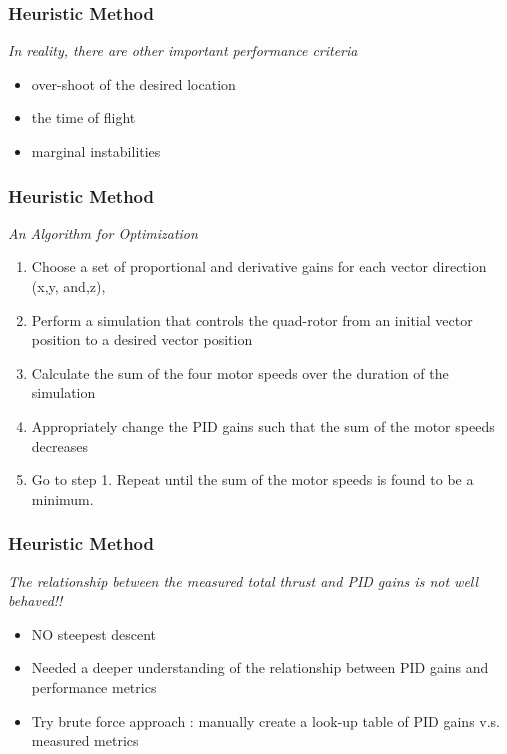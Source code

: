\documentclass{beamer}
\begin{document}
\begin{frame}

\frametitle{Heuristic Method}

\textit{In reality,  there are other important performance criteria}
\begin{itemize}
\item over-shoot of the desired location
\item the time of flight
\item marginal instabilities
\end{itemize}
\end{frame}






\begin{frame}
\frametitle{Heuristic Method}

\textit{An Algorithm for Optimization}
\begin{enumerate}
\item Choose a set of proportional and derivative gains for each vector direction (x,y, and,z),
\item Perform a simulation that controls the quad-rotor from an initial vector position to a desired vector position
\item Calculate the sum of the four motor speeds over the duration of the simulation
\item Appropriately change the PID gains such that the sum of the motor speeds decreases
\item Go to step 1. Repeat until the sum of the motor speeds is found to be a minimum.
\end{enumerate}
\end{frame}



\begin{frame}

\frametitle{Heuristic Method}

\textit{The relationship between the measured total thrust and PID gains is not well behaved!!}

\begin{itemize}
\item NO steepest descent
\item Needed a deeper understanding of the relationship between PID gains and performance metrics
\item Try brute force approach : manually create a look-up table of PID gains v.s. measured metrics

\end{itemize}
\end{frame}
\end{document}

